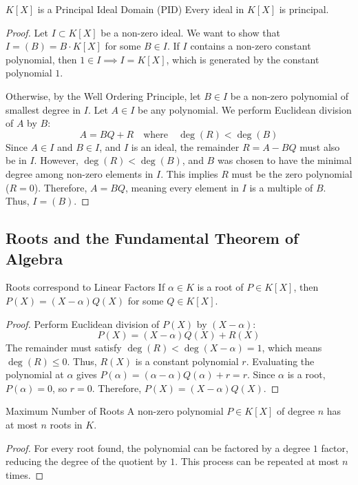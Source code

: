 \documentclass[11pt, a4paper]{article}
\begin{document}
\begin{theorem}{$K[X]$ is a Principal Ideal Domain (PID)}{}
Every ideal in $K[X]$ is principal. 
\end{theorem}
\begin{proof}
Let $I \subset K[X]$ be a non-zero ideal. We want to show that $I = (B) = B \cdot K[X]$ for some $B \in I$. 
If $I$ contains a non-zero constant polynomial, then $1 \in I \implies I = K[X]$, which is generated by the constant polynomial $1$. 

Otherwise, by the Well Ordering Principle, let $B \in I$ be a non-zero polynomial of smallest degree in $I$.
Let $A \in I$ be any polynomial. We perform Euclidean division of $A$ by $B$: 
$$ A = BQ + R \quad \text{where} \quad \deg(R) < \deg(B) $$ 
Since $A \in I$ and $B \in I$, and $I$ is an ideal, the remainder $R = A - BQ$ must also be in $I$. 
However, $\deg(R) < \deg(B)$, and $B$ was chosen to have the minimal degree among non-zero elements in $I$. 
This implies $R$ must be the zero polynomial ($R = 0$). 
Therefore, $A = BQ$, meaning every element in $I$ is a multiple of $B$. Thus, $I = (B)$. 
\end{proof}

\subsection{Roots and the Fundamental Theorem of Algebra}

\begin{proposition}{Roots correspond to Linear Factors}{}
If $\alpha \in K$ is a root of $P \in K[X]$, then $P(X) = (X - \alpha)Q(X)$ for some $Q \in K[X]$. 
\end{proposition}
\begin{proof}
Perform Euclidean division of $P(X)$ by $(X - \alpha)$:
$$ P(X) = (X - \alpha)Q(X) + R(X) $$ 
The remainder must satisfy $\deg(R) < \deg(X - \alpha) = 1$, which means $\deg(R) \le 0$. 
Thus, $R(X)$ is a constant polynomial $r$. 
Evaluating the polynomial at $\alpha$ gives $P(\alpha) = (\alpha - \alpha)Q(\alpha) + r = r$. 
Since $\alpha$ is a root, $P(\alpha) = 0$, so $r = 0$. 
Therefore, $P(X) = (X - \alpha)Q(X)$. 
\end{proof}

\begin{corollary}{Maximum Number of Roots}{}
A non-zero polynomial $P \in K[X]$ of degree $n$ has at most $n$ roots in $K$. 
\end{corollary}
\begin{proof}
For every root found, the polynomial can be factored by a degree $1$ factor, reducing the degree of the quotient by $1$. This process can be repeated at most $n$ times. 
\end{proof}
\end{document}
